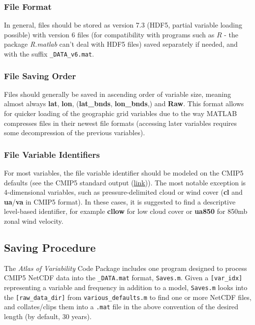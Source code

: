 \documentclass{article}
\begin{document}
\subsubsection{File Format}
In general, files should be stored as version 7.3 (HDF5, partial variable loading possible) with version 6 files (for compatibility with programs such as $R$ - the package \textit{R.matlab} can't deal with HDF5 files) saved separately if needed, and with the suffix \texttt{\_DATA\_v6.mat}. 

\subsubsection{File Saving Order}
Files should generally be saved in ascending order of variable size, meaning almost always \textbf{lat}, \textbf{lon}, (\textbf{lat\_bnds}, \textbf{lon\_bnds},) and \textbf{Raw}. This format allows for quicker loading of the geographic grid variables due to the way MATLAB compresses files in their newest file formats (accessing later variables requires some decompression of the previous variables).

\subsubsection{File Variable Identifiers}
For most variables, the file variable identifier should be modeled on the CMIP5 defaults (see the CMIP5 standard output (\href{cmip-pcmdi.llnl.gov/cmip5/docs/standard_output.pdf}{\underline{link}})). The most notable exception is 4-dimensional variables, such as pressure-delimited cloud or wind cover (\textbf{cl} and \textbf{ua}/\textbf{va} in CMIP5 format). In these cases, it is suggested to find a descriptive level-based identifier, for example \textbf{cllow} for low cloud cover or \textbf{ua850} for 850mb zonal wind velocity. 

\subsection{Saving Procedure} 
The \textit{Atlas of Variability} Code Package includes one program designed to process CMIP5 NetCDF data into the \texttt{\_DATA.mat} format, \texttt{Saves.m}. Given a \texttt{[var\_idx]} representing a variable and frequency in addition to a model, \texttt{Saves.m} looks into the \texttt{[raw\_data\_dir]} from \texttt{various\_defaults.m} to find one or more NetCDF files, and collates/clips them into a \texttt{.mat} file in the above convention of the desired length (by default, 30 years). 
\end{document}
